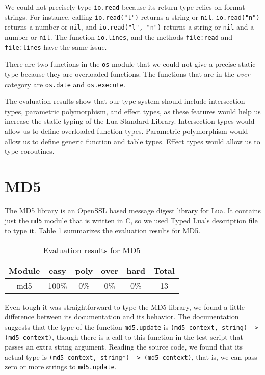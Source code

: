 We could not precisely type \texttt{io.read} because its return type
relies on format strings.
For instance, calling \texttt{io.read("l")} returns a string or \texttt{nil},
\texttt{io.read("n")} returns a number or \texttt{nil}, and
\texttt{io.read("l", "n")} returns a string or \texttt{nil} and a number or \texttt{nil}.
The function \texttt{io.lines}, and the methods \texttt{file:read} and
\texttt{file:lines} have the same issue.

There are two functions in the \texttt{os} module that we could
not give a precise static type because they are overloaded functions.
The functions that are in the \emph{over} category are
\texttt{os.date} and \texttt{os.execute}.

The evaluation results show that our type system should include
intersection types, parametric polymorphism, and effect types,
as these features would help us increase the static typing of the
Lua Standard Library.
Intersection types would allow us to define overloaded function types.
Parametric polymorphism would allow us to define generic function and table types.
Effect types would allow us to type coroutines.

\section{MD5}

The MD5 library is an OpenSSL based message digest library for Lua.
It contains just the \texttt{md5} module that is written in C,
so we used Typed Lua's description file to type it.
Table \ref{tab:evalmd5} summarizes the evaluation results for MD5.

\begin{table}[!ht]
\begin{center}
\begin{tabular}{|c|c|c|c|c|c|}
\hline
\textbf{Module} & \textbf{easy} & \textbf{poly} & \textbf{over} & \textbf{hard} & \textbf{Total} \\
\hline
md5 & 100\% & 0\% & 0\% & 0\% & 13 \\ %
\hline
\end{tabular}
\end{center}
\caption{Evaluation results for MD5}
\label{tab:evalmd5}
\end{table}

Even tough it was straightforward to type the MD5 library,
we found a little difference between its documentation and its behavior.
The documentation suggests that the type of the function \texttt{md5.update}
is \texttt{(md5\string_context, string) -> (md5\string_context)},
though there is a call to this function in the test script that passes
an extra string argument.
Reading the source code, we found that its actual type is
\texttt{(md5\string_context, string*) -> (md5\string_context)},
that is, we can pass zero or more strings to \texttt{md5.update}.


